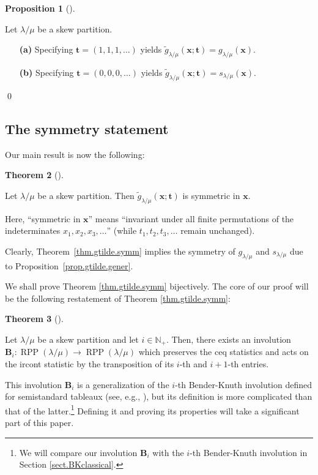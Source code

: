 \documentclass[numbers=enddot,12pt,final,onecolumn,notitlepage]{scrartcl}%
\theoremstyle{definition}
\newtheorem{theo}{Theorem}[section]
\newenvironment{theorem}[1][]
{\begin{theo}[#1]\begin{leftbar}}
{\end{leftbar}\end{theo}}
\newtheorem{prop}[theo]{Proposition}
\newenvironment{proposition}[1][]
{\begin{prop}[#1]\begin{leftbar}}
{\end{leftbar}\end{prop}}
\def\t{{\mathbf{t}}}
\def\x{{\mathbf{x}}}
\def\lm{{\lambda/\mu}}
\begin{document}
\begin{proposition}
\label{prop.gtilde.gener}Let $\lambda/\mu$ be a skew partition.

\begin{enumerate}
\item[\textbf{(a)}] Specifying $\t=\left(
1,1,1,\ldots\right)  $ yields $\widetilde{g}_{\lambda/\mu}(\x;\t)=g_{\lambda/\mu}(\x)$.

\item[\textbf{(b)}] Specifying $\t =\left(
0,0,0,\ldots\right)  $ yields $\widetilde{g}_{\lambda/\mu}(\x;\t)=s_{\lambda/\mu}(\x)$.

\end{enumerate}
\end{proposition} \qed


\subsection{The symmetry statement}

Our main result is now the following:

\begin{theorem}
\label{thm.gtilde.symm}Let $\lambda/\mu$ be a skew partition. Then
$\widetilde{g}_{\lambda/\mu}(\x;\t)$ is symmetric in $\x$.
\end{theorem}

Here, ``symmetric in $\x$'' means ``invariant under all finite
permutations of the indeterminates $x_1, x_2, x_3, \ldots$''
(while $t_1, t_2, t_3, \ldots$ remain unchanged).

Clearly, Theorem~\ref{thm.gtilde.symm} implies the symmetry of
$g_\lm$ and $s_\lm$ due to Proposition~\ref{prop.gtilde.gener}.


We shall prove Theorem \ref{thm.gtilde.symm} bijectively. The core of our
proof will be the following restatement of Theorem \ref{thm.gtilde.symm}:


 
\begin{theorem}
\label{thm.BK}Let $\lambda/\mu$ be a skew partition and let $i\in\mathbb{N}_{+}$. Then, there exists an
involution $\mathbf{B}_{i}:\operatorname{RPP}\left(  \lambda/\mu\right)
\rightarrow\operatorname{RPP}\left(  \lambda/\mu\right)  $ which preserves the ceq statistics and acts on the ircont statistic by the transposition of its $i$-th and $i+1$-th entries.
\end{theorem}


This involution $\mathbf{B}_{i}$ is a generalization of the $i$-th
Bender-Knuth involution defined for semistandard tableaux (see, e.g.,
\cite[proof of Proposition 2.11]{GriRei15}), but its definition is more
complicated than that of the latter.\footnote{We will compare our involution
$\mathbf{B}_{i}$ with the $i$-th Bender-Knuth involution in Section
\ref{sect.BKclassical}.} Defining it and proving its properties will take a
significant part of this paper.
\end{document}
